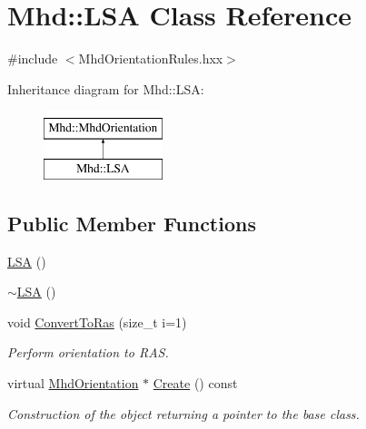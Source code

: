 \hypertarget{classMhd_1_1LSA}{\section{\-Mhd\-:\-:\-L\-S\-A \-Class \-Reference}
\label{classMhd_1_1LSA}
}


{\ttfamily \#include $<$\-Mhd\-Orientation\-Rules.\-hxx$>$}

\-Inheritance diagram for \-Mhd\-:\-:\-L\-S\-A\-:\begin{figure}[H]
\begin{center}
\leavevmode
\includegraphics[height=2.000000cm]{classMhd_1_1LSA}
\end{center}
\end{figure}
\subsection*{\-Public \-Member \-Functions}
\begin{DoxyCompactItemize}
\item 
\hyperlink{classMhd_1_1LSA_afa2881d748fdb9a46215f89a445f2534}{\-L\-S\-A} ()
\item 
\hyperlink{classMhd_1_1LSA_a67f2b1fc367f13631defb62ccef70db7}{$\sim$\-L\-S\-A} ()
\item 
void \hyperlink{classMhd_1_1LSA_ada82ad64afd2ea5adcd68678e3d7f9cf}{\-Convert\-To\-Ras} (size\-\_\-t i=1)
\begin{DoxyCompactList}\small\item\em \-Perform orientation to \-R\-A\-S. \end{DoxyCompactList}\item 
virtual \hyperlink{classMhd_1_1MhdOrientation}{\-Mhd\-Orientation} $\ast$ \hyperlink{classMhd_1_1LSA_a0c789e1d0d5af09af4ed25f9524e4587}{\-Create} () const 
\begin{DoxyCompactList}\small\item\em \-Construction of the object returning a pointer to the base class. \end{DoxyCompactList}\end{DoxyCompactItemize}


